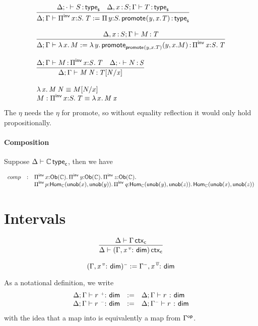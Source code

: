 \documentclass[11pt]{article}
\theoremstyle{plain}
\begin{document}
\[
\begin{array}{l}
\infer{\wftpsf{\Delta}{\Gamma}{\piinv{x}{S}{T} := \picl{y}{S}{\promote{}{y}{x.T}}}}
      {\wftpsf{\Delta}{\cdot}{S} &
       \wftpsf{\Delta,\tptm{x}{S}}{\Gamma}{T}}
\\ \\
\infer{\oftpsf{\Delta}{\Gamma}{\ulam{x}{M} := \ulam{y}{\promote{\promote{}{y}{x.T}}{y}{x.M}}}{\piinv{x}{S}{T}}}
      {\oftpsf{\Delta,\tptm{x}{S}}{\Gamma}{M}{T}}
\\ \\
\infer{\oftpsf{\Delta}{\Gamma}{\app{M}{N}}{\subst{T}{N}{x}}}
      {\oftpsf{\Delta}{\Gamma}{M}{\piinv{x}{S}{T}} &
        \oftpsf{\Delta}{\cdot}{N}{S}}
\\ \\
\app{\ulam{x}{M}}{N} \deq \subst{M}{N}{x} \\
M : \piinv{x}{S}{T} \deq \ulam{x}{\app{M}{x}} \\
\end{array}
\]
The $\eta$ needs the $\eta$ for promote, so without equality reflection
it would only hold propositionally.  

\paragraph{Composition}

Suppose $\Delta \vdash \mathbb{C} \, \mathsf{type}_{\mathsf{c}}$, then we have 

\[
\begin{array}{rcl}
comp & : & \textnormal{$\Pi$}^{\mathsf{inv}}\,x \mathit{:} {\mathsf{Ob}(\mathbb{C})}.\,\mathit{\textnormal{$\Pi$}^{\mathsf{inv}}\,y \mathit{:} {\mathsf{Ob}(\mathbb{C})}.\,\mathit{\textnormal{$\Pi$}^{\mathsf{inv}}\,z \mathit{:} {\mathsf{Ob}(\mathbb{C})}.\,\mathit{}}}\\
     &   & {\textnormal{$\Pi$}^{\mathsf{inv}}\,p \mathit{:} \mathsf{Hom}_{\mathbb{C}}(\mathsf{unob}(x),\mathsf{unob}(y)).\,\mathit{\textnormal{$\Pi$}^{\mathsf{inv}}\,q \mathit{:} \mathsf{Hom}_{\mathbb{C}}(\mathsf{unob}(y),\mathsf{unob}(z)).\,\mathit{\mathsf{Hom}_{\mathbb{C}}(\mathsf{unob}(x),\mathsf{unob}(z))}}}
\end{array}
\]

\section{Intervals}

\[
\infer{\wfctxc{\Delta}{({\Gamma},\vdimtm{x}{v})}}
      {\wfctxc{\Delta}{\Gamma}}
\]

\[
({\Gamma},\mathit{x} \,^{v}{:}^{\,} \mathit{\,}{\mathsf{dim}})^{{\text{\tiny $\mathord{-}$}}} := \Gamma^{{\text{\tiny $\mathord{-}$}}},\mathit{x} \,^{\overline{v}}{:}^{\,} \mathit{\,}{\mathsf{dim}}
\]

As a notational definition, we write 
\[
\begin{array}{rcl}
\Delta;\Gamma \vdash r \, {\,^{{\text{\tiny $\mathord{+}$}}}{:}^{\,}} \, \mathit{\mathsf{dim}} & := & \Delta;\Gamma \vdash r \, {\,^{}{:}^{\,}} \, \mathit{\mathsf{dim}} \\
\Delta;\Gamma \vdash r \, {\,^{{\text{\tiny $\mathord{-}$}}}{:}^{\,}} \, \mathit{\mathsf{dim}} & := & \Delta;\Gamma^{{\text{\tiny $\mathord{-}$}}} \vdash r \, {\,^{}{:}^{\,}} \, \mathit{\mathsf{dim}} \\
\end{array}
\]
with the idea that a map into \op{\II} is equivalently a map from
$\Gamma ^{\mathsf{op}}$.
\end{document}
